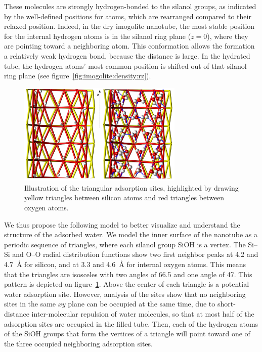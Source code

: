 \documentclass[thesis]{subfiles}
\begin{document}
These molecules are strongly hydrogen-bonded to the silanol groups, as indicated
by the well-defined positions for  atoms, which are rearranged
compared to their relaxed position. Indeed, in the dry imogolite nanotube, the
most stable position for the internal hydrogen atoms is in the silanol ring
plane ($z = 0$), where they are pointing toward a neighboring  atom.
This conformation allows the formation a relatively weak hydrogen bond, because
the  distance is large. In the hydrated tube,
the hydrogen atoms' most common position is shifted out of that silanol ring
plane (see figure~\ref{fig:imogolite:density:rz}).


\begin{figure}[hb]
	\centering
	\includegraphics[width=0.7\textwidth]{figures/images/imogolite-hbonds-sites}
	\caption{Illustration of the triangular adsorption sites, highlighted by
    drawing yellow triangles between silicon atoms and red triangles between
    oxygen atoms.}
    \label{fig:imogolite:hbonds:sites}
\end{figure}

We thus propose the following model to better visualize and understand the
structure of the adsorbed water. We model the inner surface of the nanotube as a
periodic sequence of triangles, where each silanol group SiOH is a vertex. The
Si--Si and O--O radial distribution functions show two first neighbor peaks at
4.2 and \SI{4.7}{\AA} for silicon, and at 3.3 and \SI{4.6}{\AA} for internal
oxygen atoms. This means that the triangles are isosceles with two angles of
66.5{\textdegree} and one angle of 47{\textdegree}. This pattern is depicted on
figure~\ref{fig:imogolite:hbonds:sites}. Above the center of each triangle is a
potential water adsorption site. However, analysis of the sites show that no
neighboring sites in the same $xy$ plane can be occupied at the same time, due
to short-distance inter-molecular repulsion of water molecules, so that at most
half of the adsorption sites are occupied in the filled tube. Then, each of the
hydrogen atoms of the SiOH groups that form the vertices of a triangle will
point toward one of the three occupied neighboring adsorption sites.
\end{document}
